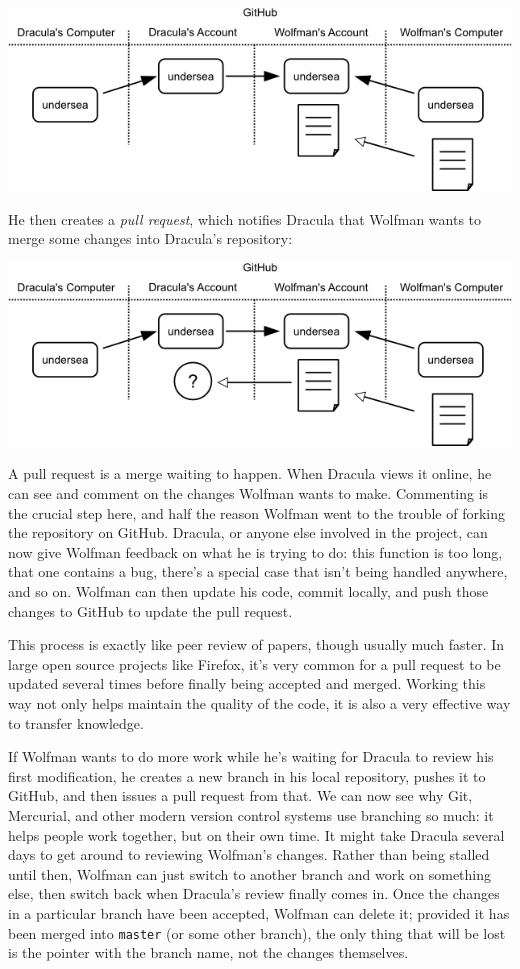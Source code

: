 \documentclass[]{book}
\newcommand{\gdef}[2]{\emph{#2}}
\begin{document}
\includegraphics{novice/extras/img/git-forking-02.png}

He then creates a \gdef{g:pull-request}{pull request}, which
notifies Dracula that Wolfman wants to merge some changes into Dracula's
repository:

\includegraphics{novice/extras/img/git-forking-03.png}

A pull request is a merge waiting to happen. When Dracula views it
online, he can see and comment on the changes Wolfman wants to make.
Commenting is the crucial step here, and half the reason Wolfman went to
the trouble of forking the repository on GitHub. Dracula, or anyone else
involved in the project, can now give Wolfman feedback on what he is
trying to do: this function is too long, that one contains a bug,
there's a special case that isn't being handled anywhere, and so on.
Wolfman can then update his code, commit locally, and push those changes
to GitHub to update the pull request.

This process is exactly like peer review of papers, though usually much
faster. In large open source projects like Firefox, it's very common for
a pull request to be updated several times before finally being accepted
and merged. Working this way not only helps maintain the quality of the
code, it is also a very effective way to transfer knowledge.

If Wolfman wants to do more work while he's waiting for Dracula to
review his first modification, he creates a new branch in his local
repository, pushes it to GitHub, and then issues a pull request from
that. We can now see why Git, Mercurial, and other modern version
control systems use branching so much: it helps people work together,
but on their own time. It might take Dracula several days to get around
to reviewing Wolfman's changes. Rather than being stalled until then,
Wolfman can just switch to another branch and work on something else,
then switch back when Dracula's review finally comes in. Once the
changes in a particular branch have been accepted, Wolfman can delete
it; provided it has been merged into \texttt{master} (or some other
branch), the only thing that will be lost is the pointer with the branch
name, not the changes themselves.
\end{document}

